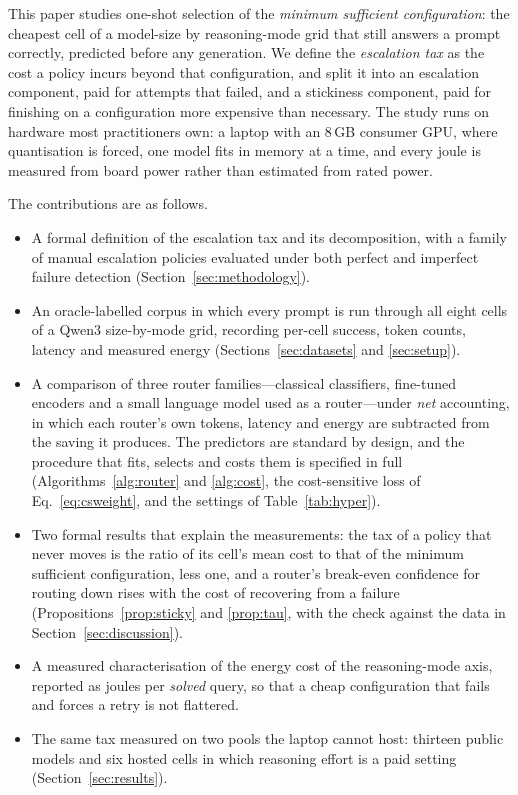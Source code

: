 \documentclass[final,5p,times,twocolumn]{elsarticle}
\theoremstyle{plain}
\begin{document}
This paper studies one-shot selection of the \emph{minimum sufficient
configuration}: the cheapest cell of a model-size by reasoning-mode grid that
still answers a prompt correctly, predicted before any generation. We define
the \emph{escalation tax} as the cost a policy incurs beyond that
configuration, and split it into an escalation component, paid for attempts
that failed, and a stickiness component, paid for finishing on a
configuration more expensive than necessary. The study runs on hardware most
practitioners own: a laptop with an 8\,GB consumer GPU, where quantisation is
forced, one model fits in memory at a time, and every joule is measured from
board power rather than estimated from rated power.

The contributions are as follows.
\begin{itemize}
  \item A formal definition of the escalation tax and its decomposition, with
        a family of manual escalation policies evaluated under both perfect
        and imperfect failure detection (Section~\ref{sec:methodology}).
  \item An oracle-labelled corpus in which every prompt is run through all
        eight cells of a Qwen3 size-by-mode grid, recording per-cell success,
        token counts, latency and measured energy
        (Sections~\ref{sec:datasets} and \ref{sec:setup}).
  \item A comparison of three router families---classical classifiers,
        fine-tuned encoders and a small language model used as a
        router---under \emph{net} accounting, in which each router's own
        tokens, latency and energy are subtracted from the saving it
        produces. The predictors are standard by design, and the
        procedure that fits, selects and costs them is specified in full
        (Algorithms~\ref{alg:router} and \ref{alg:cost}, the
        cost-sensitive loss of Eq.~\eqref{eq:csweight}, and the settings of
        Table~\ref{tab:hyper}).
  \item Two formal results that explain the measurements: the tax of a
        policy that never moves is the ratio of its cell's mean cost to that
        of the minimum sufficient configuration, less one, and a router's
        break-even confidence for routing down rises with the cost of
        recovering from a failure (Propositions~\ref{prop:sticky} and
        \ref{prop:tau}, with the check against the data in
        Section~\ref{sec:discussion}).
  \item A measured characterisation of the energy cost of the reasoning-mode
        axis, reported as joules per \emph{solved} query, so that a cheap
        configuration that fails and forces a retry is not flattered.
  \item The same tax measured on two pools the laptop cannot host: thirteen
        public models and six hosted cells in which reasoning effort is a
        paid setting (Section~\ref{sec:results}).
\end{itemize}
\end{document}
